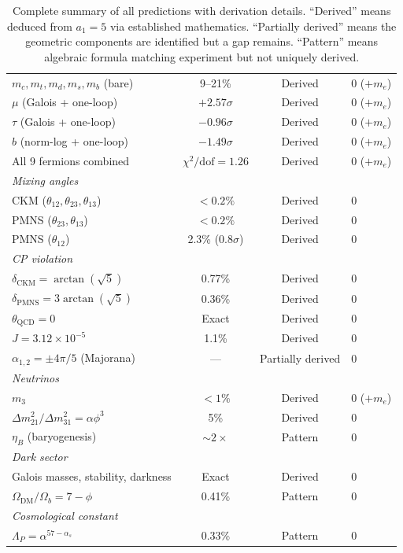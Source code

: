 \documentclass[12pt,a4paper]{article}
\theoremstyle{definition}
\begin{document}
\begin{table}[H]
\begin{tabular}{lccl}
$m_c, m_t, m_d, m_s, m_b$ (bare) & 9--21\% & Derived & 0 ($+m_e$) \\
$\mu$ (Galois + one-loop) & $+2.57\sigma$ & Derived & 0 ($+m_e$) \\
$\tau$ (Galois + one-loop) & $-0.96\sigma$ & Derived & 0 ($+m_e$) \\
$b$ (norm-log + one-loop) & $-1.49\sigma$ & Derived & 0 ($+m_e$) \\
All 9 fermions combined & $\chi^2/\text{dof} = 1.26$ & Derived & 0 ($+m_e$) \\
\midrule
\multicolumn{4}{l}{\textit{Mixing angles}} \\
CKM ($\theta_{12}, \theta_{23}, \theta_{13}$) & $<0.2\%$ & Derived & 0 \\
PMNS ($\theta_{23}, \theta_{13}$) & $<0.2\%$ & Derived & 0 \\
PMNS ($\theta_{12}$) & 2.3\% ($0.8\sigma$) & Derived & 0 \\
\midrule
\multicolumn{4}{l}{\textit{CP violation}} \\
$\delta_{\text{CKM}} = \arctan(\sqrt{5})$ & 0.77\% & Derived & 0 \\
$\delta_{\text{PMNS}} = 3\arctan(\sqrt{5})$ & 0.36\% & Derived & 0 \\
$\theta_{\text{QCD}} = 0$ & Exact & Derived & 0 \\
$J = 3.12 \times 10^{-5}$ & 1.1\% & Derived & 0 \\
$\alpha_{1,2} = \pm 4\pi/5$ (Majorana) & --- & Partially derived & 0 \\
\midrule
\multicolumn{4}{l}{\textit{Neutrinos}} \\
$m_3$ & $<1\%$ & Derived & 0 ($+m_e$) \\
$\Delta m^2_{21}/\Delta m^2_{31} = \alpha\phi^3$ & 5\% & Derived & 0 \\
$\eta_B$ (baryogenesis) & $\sim 2\times$ & Pattern & 0 \\
\midrule
\multicolumn{4}{l}{\textit{Dark sector}} \\
Galois masses, stability, darkness & Exact & Derived & 0 \\
$\Omega_{\text{DM}}/\Omega_b = 7-\phi$ & 0.41\% & Pattern & 0 \\
\midrule
\multicolumn{4}{l}{\textit{Cosmological constant}} \\
$\Lambda_P = \alpha^{57-\alpha_s}$ & 0.33\% & Pattern & 0 \\
\bottomrule
\end{tabular}
\caption[Complete summary of all predictions.]{Complete summary of all predictions with derivation details.  ``Derived'' means deduced from $a_1 = 5$ via established mathematics.  ``Partially derived'' means the geometric components are identified but a gap remains.  ``Pattern'' means algebraic formula matching experiment but not uniquely derived. \newline
}
\end{table}
\end{document}
